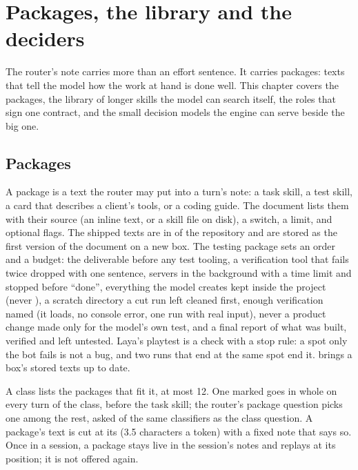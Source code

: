 \chapter{Packages, the library and the deciders}\label{ch:packages}

The router's note carries more than an effort sentence. It carries packages: texts that tell the model how the work at hand is done well. This chapter covers the packages, the library of longer skills the model can search itself, the roles that sign one contract, and the small decision models the engine can serve beside the big one.

\section{Packages}

A package is a text the router may put into a turn's note: a task skill, a test skill, a card that describes a client's tools, or a coding guide. The  document lists them with their source (an inline text, or a skill file on disk), a switch, a  limit, and optional flags. The shipped texts are in  of the repository and are stored as the first version of the document on a new box. The testing package sets an order and a budget: the deliverable before any test tooling, a verification tool that fails twice dropped with one sentence, servers in the background with a time limit and stopped before ``done'', everything the model creates kept inside the project (never ), a scratch directory a cut run left cleaned first, enough verification named (it loads, no console error, one run with real input), never a product change made only for the model's own test, and a final report of what was built, verified and left untested. Laya's playtest is a check with a stop rule: a spot only the bot fails is not a bug, and two runs that end at the same spot end it.  brings a box's stored texts up to date.

A class lists the packages that fit it, at most 12. One marked  goes in whole on every turn of the class, before the task skill; the router's package question picks one among the rest, asked of the same classifiers as the class question. A package's text is cut at its  (3.5 characters a token) with a fixed note that says so. Once in a session, a package stays live in the session's notes and replays at its position; it is not offered again.

